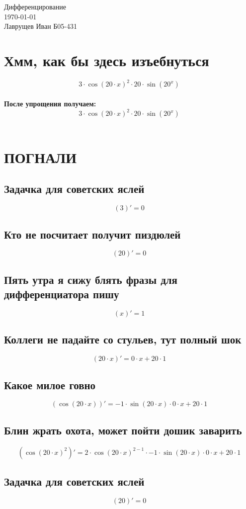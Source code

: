\documentclass[12pt]{article}
\begin{document}
\begingroup
    \centering
    \LARGE Дифференцирование\\
    \large \today \\[0.5em]
    \large Лаврущев Иван Б05-431\par
\endgroup
\tableofcontents
\section{Хмм, как бы здесь изъебнуться}
$$3 \cdot \cos(20 \cdot x)^{2} \cdot 20 \cdot \sin(20^{x})$$\\
\textbf{После упрощения получаем:}\\
$$3 \cdot \cos(20 \cdot x)^{2} \cdot 20 \cdot \sin(20^{x})$$\\
\section{ПОГНАЛИ}
\subsection{Задачка для советских яслей}
$$(3)' = 0$$
\subsection{Кто не посчитает получит пиздюлей}
$$(20)' = 0$$
\subsection{Пять утра я сижу блять фразы для дифференциатора пишу}
$$(x)' = 1$$
\subsection{Коллеги не падайте со стульев, тут полный шок}
$$(20 \cdot x)' = 0 \cdot x + 20 \cdot 1$$
\subsection{Какое милое говно}
$$(\cos(20 \cdot x))' = -1 \cdot \sin(20 \cdot x) \cdot 0 \cdot x + 20 \cdot 1$$
\subsection{Блин жрать охота, может пойти дошик заварить}
$$(\cos(20 \cdot x)^{2})' = 2 \cdot \cos(20 \cdot x)^{2 - 1} \cdot -1 \cdot \sin(20 \cdot x) \cdot 0 \cdot x + 20 \cdot 1$$
\subsection{Задачка для советских яслей}
$$(20)' = 0$$
\end{document}
